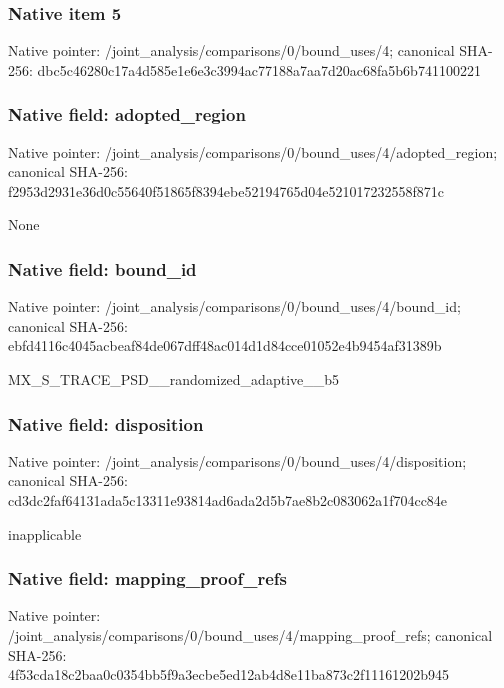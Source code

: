 \documentclass[10pt,a4paper]{article}
\begin{document}
\subsubsection{Native item 5}
Native pointer: /joint\_\allowbreak{}analysis/comparisons/0/bound\_\allowbreak{}uses/4; canonical SHA-256: dbc5c46280c17a4d585e1e6e3c3994ac77188a7aa7d20ac68fa5b6b741100221

\subsubsection{Native field: adopted\_\allowbreak{}region}
Native pointer: /joint\_\allowbreak{}analysis/comparisons/0/bound\_\allowbreak{}uses/4/adopted\_\allowbreak{}region; canonical SHA-256: f2953d2931e36d0c55640f51865f8394ebe52194765d04e521017232558f871c

\begingroup\raggedright\sloppy None\par\endgroup

\subsubsection{Native field: bound\_\allowbreak{}id}
Native pointer: /joint\_\allowbreak{}analysis/comparisons/0/bound\_\allowbreak{}uses/4/bound\_\allowbreak{}id; canonical SHA-256: ebfd4116c4045acbeaf84de067dff48ac014d1d84cce01052e4b9454af31389b

\begingroup\raggedright\sloppy MX\_\allowbreak{}S\_\allowbreak{}TRACE\_\allowbreak{}PSD\_\allowbreak{}\_\allowbreak{}randomized\_\allowbreak{}adaptive\_\allowbreak{}\_\allowbreak{}b5\par\endgroup

\subsubsection{Native field: disposition}
Native pointer: /joint\_\allowbreak{}analysis/comparisons/0/bound\_\allowbreak{}uses/4/disposition; canonical SHA-256: cd3dc2faf64131ada5c13311e93814ad6ada2d5b7ae8b2c083062a1f704cc84e

\begingroup\raggedright\sloppy inapplicable\par\endgroup

\subsubsection{Native field: mapping\_\allowbreak{}proof\_\allowbreak{}refs}
Native pointer: /joint\_\allowbreak{}analysis/comparisons/0/bound\_\allowbreak{}uses/4/mapping\_\allowbreak{}proof\_\allowbreak{}refs; canonical SHA-256: 4f53cda18c2baa0c0354bb5f9a3ecbe5ed12ab4d8e11ba873c2f11161202b945
\end{document}
